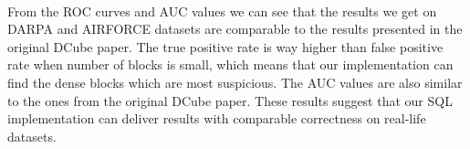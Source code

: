 \paragraph{} From the ROC curves and AUC values we can see that the results we get on DARPA and AIRFORCE datasets are comparable to the
results presented in the original DCube paper. The true positive rate is way higher than false positive rate when number of blocks is small,
which means that our implementation can find the dense blocks which are most suspicious. The AUC values are also similar to the ones from the
original DCube paper. These results suggest that our SQL implementation can deliver results with comparable correctness on real-life datasets.
